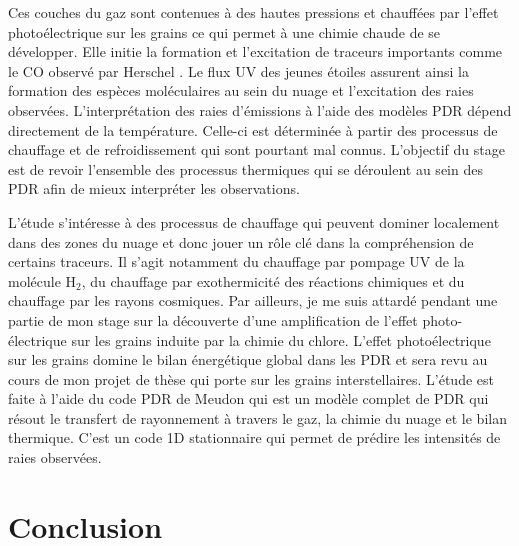 \documentclass[11pt,a4paper]{article}
\begin{document}
\begin{spacing}{0.98}
Ces couches du gaz sont contenues à des hautes pressions et chauffées par l'effet photoélectrique sur les grains ce qui permet à une chimie chaude de se développer. Elle initie la formation et l'excitation de traceurs importants comme le CO observé par Herschel \cite{COJoblin}. Le flux UV des jeunes étoiles assurent ainsi la formation des espèces moléculaires au sein du nuage et l'excitation des raies observées. L'interprétation des raies d'émissions à l'aide des modèles PDR dépend directement de la température. Celle-ci est déterminée à partir des processus de chauffage et de refroidissement qui sont pourtant mal connus. L'objectif du stage est de revoir l'ensemble des processus thermiques qui se déroulent au sein des PDR afin de mieux interpréter les observations. \newline

L'étude s'intéresse à des processus de chauffage qui peuvent dominer localement dans des zones du nuage et donc jouer un rôle clé dans la compréhension de certains traceurs. Il s'agit notamment du chauffage par pompage UV de la molécule $\mathrm{H}_2$, du chauffage par exothermicité des réactions chimiques et du chauffage par les rayons cosmiques. Par ailleurs, je me suis attardé pendant une partie de mon stage sur la découverte d'une amplification de l'effet photo-électrique sur les grains induite par la chimie du chlore. L'effet photoélectrique sur les grains domine le bilan énergétique global dans les PDR et sera revu au cours de mon projet de thèse qui porte sur les grains interstellaires. L'étude est faite à l'aide du code PDR de Meudon \cite{LePetit2006} qui est un modèle complet de PDR qui résout le transfert de rayonnement à travers le gaz, la chimie du nuage et le bilan thermique. C'est un code 1D stationnaire qui permet de prédire les intensités de raies observées. \newline 


\clearpage




\section*{Conclusion}

\clearpage



\clearpage





\end{spacing}
\end{document}
